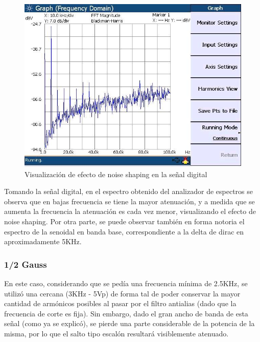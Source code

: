 \documentclass[assd_tp3_main.tex]{subfiles}
\begin{document}
\begin{figure}[!ht]
\begin{centering}
\includegraphics[scale=0.55]{../EJ4/Mediciones/Seno/s1_ns.jpeg}
\par\end{centering}
\caption{Visualización de efecto de noise shaping en la señal digital}
\end{figure}

Tomando la señal digital, en el espectro obtenido del analizador de espectros se observa que en bajas frecuencia se tiene la mayor atenuación, y a medida que se aumenta la frecuencia la atenuación es cada vez menor, visualizando el efecto de noise shaping. Por otra parte, se puede observar también en forma notoria el espectro de la senoidal en banda base, correspondiente a la delta de dirac en aproximadamente 5KHz.

\subsubsection{1/2 Gauss}
En este caso, considerando que se pedía una frecuencia mínima de 2.5KHz, se utilizó una cercana (3KHz - 5Vp) de forma tal de poder conservar la mayor cantidad de armónicos posibles al pasar por el filtro antialias (dado que la frecuencia de corte es fija). Sin embargo, dado el gran ancho de banda de esta señal (como ya se explicó), se pierde una parte considerable de la potencia de la misma, por lo que el salto tipo escalón resultará visiblemente atenuado.
\end{document}
